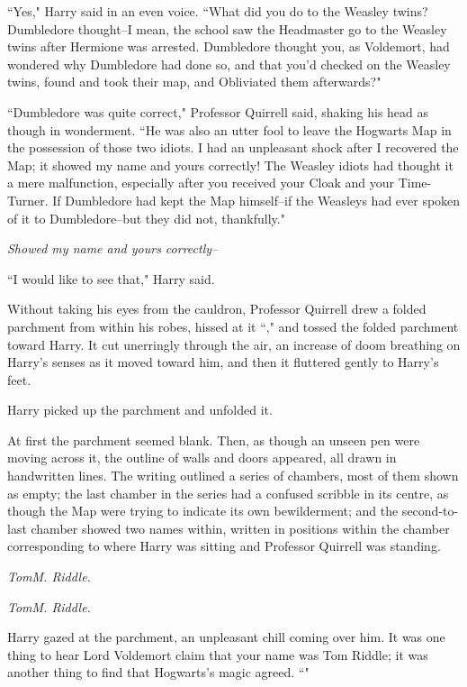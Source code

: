 ``Yes," Harry said in an even voice. ``What did you do to the Weasley twins? Dumbledore thought\---I mean, the school saw the Headmaster go to the Weasley twins after Hermione was arrested. Dumbledore thought you, as Voldemort, had wondered why Dumbledore had done so, and that you'd checked on the Weasley twins, found and took their map, and Obliviated them afterwards?"

``Dumbledore was quite correct," Professor Quirrell said, shaking his head as though in wonderment. ``He was also an utter fool to leave the Hogwarts Map in the possession of those two idiots. I had an unpleasant shock after I recovered the Map; it showed my name and yours correctly! The Weasley idiots had thought it a mere malfunction, especially after you received your Cloak and your Time-Turner. If Dumbledore had kept the Map himself\---if the Weasleys had ever spoken of it to Dumbledore\---but they did not, thankfully."

\emph{Showed my name and yours correctly\---}

``I would like to see that," Harry said.

Without taking his eyes from the cauldron, Professor Quirrell drew a folded parchment from within his robes, hissed at it ``," and tossed the folded parchment toward Harry. It cut unerringly through the air, an increase of doom breathing on Harry's senses as it moved toward him, and then it fluttered gently to Harry's feet.

Harry picked up the parchment and unfolded it.

At first the parchment seemed blank. Then, as though an unseen pen were moving across it, the outline of walls and doors appeared, all drawn in handwritten lines. The writing outlined a series of chambers, most of them shown as empty; the last chamber in the series had a confused scribble in its centre, as though the Map were trying to indicate its own bewilderment; and the second-to-last chamber showed two names within, written in positions within the chamber corresponding to where Harry was sitting and Professor Quirrell was standing.

\emph{Tom\?M. Riddle.}

\emph{Tom\?M. Riddle.}

Harry gazed at the parchment, an unpleasant chill coming over him. It was one thing to hear Lord Voldemort claim that your name was Tom Riddle; it was another thing to find that Hogwarts's magic agreed. ``"

